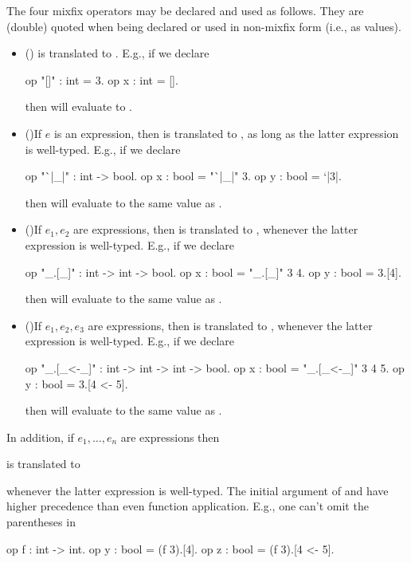 The four mixfix operators may be declared and used as follows. They
are (double) quoted when being declared or used in non-mixfix form
(i.e., as values).
\begin{itemize}
\item (\ec{[]})\quad \ec{[]} is translated to \ec{\"[]\"}. E.g.,
  if we declare
\begin{easycrypt}{}{}
op "[]" : int = 3.
op x : int = [].
\end{easycrypt}
then  will evaluate to .

\item ()\quad If $e$ is an expression, then  is
  translated to , as long as the latter expression
  is well-typed.  E.g., if we declare
\begin{easycrypt}{}{}
op "`|_|" : int -> bool.
op x : bool = "`|_|" 3.
op y : bool = `|3|.
\end{easycrypt}
then  will evaluate to the same value as .

\item ()\quad If $e_1,e_2$ are expressions, then
     is translated to , whenever the latter expression is well-typed. E.g., if
    we declare
\begin{easycrypt}{}{}
op "_.[_]" : int -> int -> bool.
op x : bool = "_.[_]" 3 4.
op y : bool = 3.[4].
\end{easycrypt}
then  will evaluate to the same value as .

\item ()\quad If $e_1,e_2,e_3$ are expressions, then
     is translated to , whenever the latter expression is
    well-typed. E.g., if we declare
\begin{easycrypt}{}{}
op "_.[_<-_]" : int -> int -> int -> bool.
op x : bool = "_.[_<-_]" 3 4 5.
op y : bool = 3.[4 <- 5].
\end{easycrypt}
then  will evaluate to the same value as .
\end{itemize}
In addition, if $e_1,\ldots,e_n$ are expressions then
\begin{center}
\ec{[$e_1$; $\;\ldots\,$; $\,e_n$]}  
\qquad is translated to \qquad
{}
\end{center}
whenever the latter expression is well-typed.
The initial argument of  and  have
higher precedence than even function application. E.g., one
can't omit the parentheses in
\begin{easycrypt}{}{}
op f : int -> int.
op y : bool = (f 3).[4].
op z : bool = (f 3).[4 <- 5].
\end{easycrypt}

